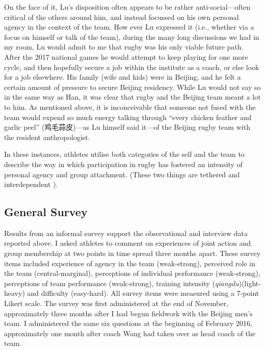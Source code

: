 \begin{CJK}{UTF8}{gbsn}
On the face of it, Lu's disposition often appears to be rather anti-social---often critical of the others around him, and instead focussed on his own personal agency in the context of the team.  How ever Lu expressed it (i.e., whether via a focus on himself or talk of the team), during the many long discussions we had in my room, Lu would admit to me that rugby was his only viable future path.  After the 2017 national games he would attempt to keep playing for one more cycle, and then hopefully secure a job within the institute as a coach, or else look for a job elsewhere.  His family (wife and kids) were in Beijing, and he felt a certain amount of pressure to secure Beijing residency.  While Lu would not say so in the same way as Han, it was clear that rugby and the Beijing team meant a lot to him. As mentioned above, it is inconceivable that someone not fused with the team would expend so much energy talking through ``every chicken feather and garlic peel'' (鸡毛蒜皮)---as Lu himself said it---of the Beijing rugby team with the resident anthropologist.


In these instances, athletes utilise both categories of the self and the team to describe the way in which participation in rugby has fostered an intensity of personal agency and group attachment.  (These two things are tethered and interdependent \citep{Kelso2016}).







\clearpage



\subsection{General Survey}

  


Results from an informal survey support the observational and interview data reported above.  I asked athletes to comment on experiences of joint action and group membership at two points in time spread three months apart. These survey items included experience of agency in the team (weak-strong), perceived role in the team (central-marginal), perceptions of individual performance (weak-strong), perceptions of team performance (weak-strong), training intensity (\textit{qiangdu})(light-heavy) and difficulty (easy-hard).  All survey items were measured using a 7-point Likert scale.  The survey was first administered at the end of November, approximately three months after I had begun fieldwork with the Beijing men's team.  I administered the same six questions at the beginning of February 2016, approximately one month after coach Wang had taken over as head coach of the team.


\end{CJK}
